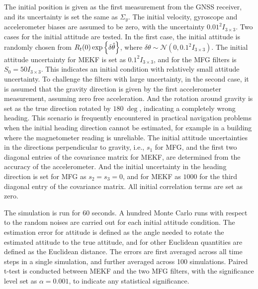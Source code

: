 The initial position is given as the first measurement from the GNSS receiver, and its uncertainty is set the same as $\Sigma_y$.
The initial velocity, gyroscope and accelerometer biases are assumed to be zero, with the uncertainty $0.01^2I_{3\times 3}$.
Two cases for the initial attitude are tested.
In the first case, the initial attitude is randomly chosen from $R_t(0)\exp\left\{ \delta\hat{\theta} \right\}$, where $\delta\theta\sim\mathcal{N}(0,0.1^2I_{3\times 3})$.
The initial attitude uncertainty for MEKF is set as $0.1^2I_{3\times 3}$, and for the MFG filters is $S_0 = 50I_{3\times 3}$.
This indicates an initial condition with relatively small attitude uncertainty.
To challenge the filters with large uncertainty, in the second case, it is assumed that the gravity direction is given by the first accelerometer measurement, assuming zero free acceleration.
And the rotation around gravity is set as the true direction rotated by $\SI{180}{\deg}$, indicating a completely wrong heading.
This scenario is frequently encountered in practical navigation problems when the initial heading direction cannot be estimated, for example in a building where the magnetometer reading is unreliable.
The initial attitude uncertainties in the directions perpendicular to gravity, i.e., $s_1$ for MFG, and the first two diagonal entries of the covariance matrix for MEKF, are determined from the accuracy of the accelerometer.
And the initial uncertainty in the heading direction is set for MFG as $s_2 = s_3 = 0$, and for MEKF as $1000$ for the third diagonal entry of the covariance matrix.
All initial correlation terms are set as zero.

The simulation is run for 60 seconds.
A hundred Monte Carlo runs with respect to the random noises are carried out for each initial attitude condition.
The estimation error for attitude is defined as the angle needed to rotate the estimated attitude to the true attitude, and for other Euclidean quantities are defined as the Euclidean distance.
The errors are first averaged across all time steps in a single simulation, and further averaged across 100 simulations.
Paired t-test is conducted between MEKF and the two MFG filters, with the significance level set as $\alpha=0.001$, to indicate any statistical significance.

